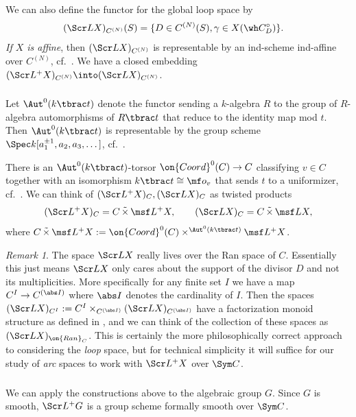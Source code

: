 \documentclass[final]{amsart}
\theoremstyle{remark}
\newtheorem{rem}[subsubsection]{Remark}
\theoremstyle{definition}
\DeclareMathOperator*{\ttimes}{\tilde\times}
\numberwithin{equation}{section}
\begin{document}
We can also define the functor for the global loop space by 
\begin{align*} 
(\Scr L X)_{C^{(N)}}(S) & = \{ D \in C^{(N)}(S), \gamma \in X(\wh C^\circ_D) \}. 
\end{align*}
\emph{If $X$ is affine}, then $(\Scr L X)_{C^{(N)}}$ 
is representable by an ind-scheme ind-affine over $C^{(N)}$,
cf.~\cite[Proposition 2.5.2]{KV}. 
We have a closed embedding $(\Scr L^+ X)_{C^{(N)}} \into (\Scr L X)_{C^{(N)}}$.

\subsubsection{}\label{sect:Llocalization}
Let $\Aut^0(k\tbrac t)$ denote the functor sending a $k$-algebra $R$
to the group of $R$-algebra automorphisms of $R\tbrac t$ that reduce to
the identity map mod $t$. Then $\Aut^0(k\tbrac t)$ is representable 
by the group scheme $\Spec k[a_1^{\pm 1}, a_2, a_3, \dotsc]$, cf.~\cite[(1.3.13)]{Xinwen}. 

\smallskip

There is an $\Aut^0(k\tbrac t)$-torsor $\on{Coord}^0(C) \to C$
classifying $v \in C$ together with an isomorphism $k\tbrac t \cong \mf o_v$
that sends $t$ to a uniformizer, cf.~\cite[(3.1.10)]{Xinwen}. 
We can think of $(\Scr L^+ X)_C, (\Scr L X)_C$ as twisted products 
\[
    (\Scr L^+ X)_C = C \ttimes \msf L^+ X, \qquad (\Scr L X)_C = C\ttimes \msf L X, 
\]
where $C \ttimes \msf L^+ X := \on{Coord}^0(C) \times^{\Aut^0(k\tbrac t)} \msf L^+ X$.


\begin{rem}
The space $\Scr L X$ really lives over
the Ran space of $C$. Essentially this just means $\Scr L X$
only cares about the support of the divisor $D$ and not its multiplicities. 
More specifically for any finite set $I$ we have a map 
$C^I \to C^{(\abs I)}$ where $\abs I$ denotes the cardinality of $I$. 
Then the spaces $(\Scr L X)_{C^I} := C^I \times_{C^{(\abs I)}} (\Scr L X)_{C^{(\abs I)}}$ 
have a factorization monoid structure as
defined in \cite[Definition 2.2.1]{KV}, and we can think 
of the collection of these spaces as $(\Scr L X)_{\on{Ran}_C}$. 
This is certainly the more philosophically correct approach to 
considering the \emph{loop} space, but for technical simplicity 
it will suffice for our study of \emph{arc} spaces to work with $\Scr L^+ X$
over $\Sym C$.
\end{rem}

\subsubsection{} \label{sect:localGr}
We can apply the constructions above to the algebraic group $G$. 
Since $G$ is smooth, $\Scr L^+ G$ is a group scheme formally smooth over 
$\Sym C$.
\end{document}
